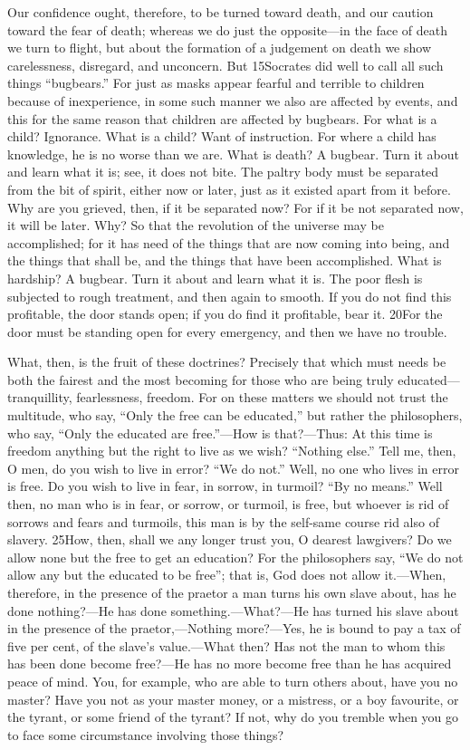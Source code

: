 Our confidence ought, therefore, to be turned toward death, and our caution toward the fear of death; whereas we do just the opposite—in the face of death we turn to flight, but about the formation of a judgement on death we show carelessness, disregard, and unconcern. But 15Socrates did well to call all such things ``bugbears.'' For just as masks appear fearful and terrible to children because of inexperience, in some such manner we also are affected by events, and this for the same reason that children are affected by bugbears. For what is a child? Ignorance. What is a child? Want of instruction. For where a child has knowledge, he is no worse than we are. What is death? A bugbear. Turn it about and learn what it is; see, it does not bite. The paltry body must be separated from the bit of spirit, either now or later, just as it existed apart from it before. Why are you grieved, then, if it be separated now? For if it be not separated now, it will be later. Why? So that the revolution of the universe may be accomplished; for it has need of the things that are now coming into being, and the things that shall be, and the things that have been accomplished. What is hardship? A bugbear. Turn it about and learn what it is. The poor flesh is subjected to rough treatment, and then again to smooth. If you do not find this profitable, the door stands open; if you do find it profitable, bear it. 20For the door must be standing open for every emergency, and then we have no trouble.

What, then, is the fruit of these doctrines? Precisely that which must needs be both the fairest and the most becoming for those who are being truly educated—tranquillity, fearlessness, freedom. For on these matters we should not trust the multitude, who say, ``Only the free can be educated,'' but rather the philosophers, who say, ``Only the educated are free.''—How is that?—Thus: At this time is freedom anything but the right to live as we wish? ``Nothing else.'' Tell me, then, O men, do you wish to live in error? ``We do not.'' Well, no one who lives in error is free. Do you wish to live in fear, in sorrow, in turmoil? ``By no means.'' Well then, no man who is in fear, or sorrow, or turmoil, is free, but whoever is rid of sorrows and fears and turmoils, this man is by the self-same course rid also of slavery. 25How, then, shall we any longer trust you, O dearest lawgivers? Do we allow none but the free to get an education? For the philosophers say, ``We do not allow any but the educated to be free''; that is, God does not allow it.—When, therefore, in the presence of the praetor a man turns his own slave about, has he done nothing?—He has done something.—What?—He has turned his slave about in the presence of the praetor,—Nothing more?—Yes, he is bound to pay a tax of five per cent, of the slave's value.—What then? Has not the man to whom this has been done become free?—He has no more become free than he has acquired peace of mind. You, for example, who are able to turn others about, have you no master? Have you not as your master money, or a mistress, or a boy favourite, or the tyrant, or some friend of the tyrant? If not, why do you tremble when you go to face some circumstance involving those things?

